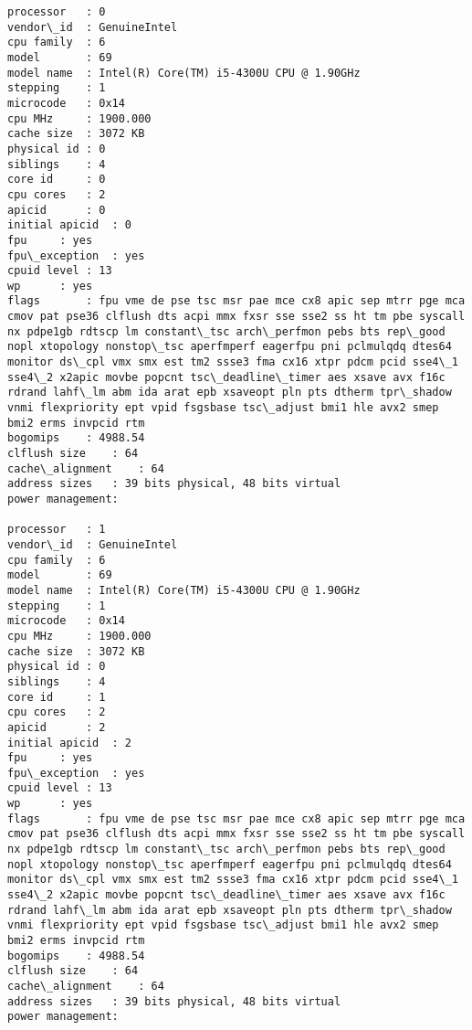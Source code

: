 \par\vspace{1\smallerfontscale}%
    \begin{addmargin}[\cellleftmargin]{0em}%
    {\smaller%
    \vspace{-1\smallerfontscale}%
    
    \begin{Verbatim}[commandchars=\\\{\}]
processor	: 0
vendor\_id	: GenuineIntel
cpu family	: 6
model		: 69
model name	: Intel(R) Core(TM) i5-4300U CPU @ 1.90GHz
stepping	: 1
microcode	: 0x14
cpu MHz		: 1900.000
cache size	: 3072 KB
physical id	: 0
siblings	: 4
core id		: 0
cpu cores	: 2
apicid		: 0
initial apicid	: 0
fpu		: yes
fpu\_exception	: yes
cpuid level	: 13
wp		: yes
flags		: fpu vme de pse tsc msr pae mce cx8 apic sep mtrr pge mca cmov pat pse36 clflush dts acpi mmx fxsr sse sse2 ss ht tm pbe syscall nx pdpe1gb rdtscp lm constant\_tsc arch\_perfmon pebs bts rep\_good nopl xtopology nonstop\_tsc aperfmperf eagerfpu pni pclmulqdq dtes64 monitor ds\_cpl vmx smx est tm2 ssse3 fma cx16 xtpr pdcm pcid sse4\_1 sse4\_2 x2apic movbe popcnt tsc\_deadline\_timer aes xsave avx f16c rdrand lahf\_lm abm ida arat epb xsaveopt pln pts dtherm tpr\_shadow vnmi flexpriority ept vpid fsgsbase tsc\_adjust bmi1 hle avx2 smep bmi2 erms invpcid rtm
bogomips	: 4988.54
clflush size	: 64
cache\_alignment	: 64
address sizes	: 39 bits physical, 48 bits virtual
power management:

processor	: 1
vendor\_id	: GenuineIntel
cpu family	: 6
model		: 69
model name	: Intel(R) Core(TM) i5-4300U CPU @ 1.90GHz
stepping	: 1
microcode	: 0x14
cpu MHz		: 1900.000
cache size	: 3072 KB
physical id	: 0
siblings	: 4
core id		: 1
cpu cores	: 2
apicid		: 2
initial apicid	: 2
fpu		: yes
fpu\_exception	: yes
cpuid level	: 13
wp		: yes
flags		: fpu vme de pse tsc msr pae mce cx8 apic sep mtrr pge mca cmov pat pse36 clflush dts acpi mmx fxsr sse sse2 ss ht tm pbe syscall nx pdpe1gb rdtscp lm constant\_tsc arch\_perfmon pebs bts rep\_good nopl xtopology nonstop\_tsc aperfmperf eagerfpu pni pclmulqdq dtes64 monitor ds\_cpl vmx smx est tm2 ssse3 fma cx16 xtpr pdcm pcid sse4\_1 sse4\_2 x2apic movbe popcnt tsc\_deadline\_timer aes xsave avx f16c rdrand lahf\_lm abm ida arat epb xsaveopt pln pts dtherm tpr\_shadow vnmi flexpriority ept vpid fsgsbase tsc\_adjust bmi1 hle avx2 smep bmi2 erms invpcid rtm
bogomips	: 4988.54
clflush size	: 64
cache\_alignment	: 64
address sizes	: 39 bits physical, 48 bits virtual
power management:


\end{Verbatim}}
\end{addmargin}
